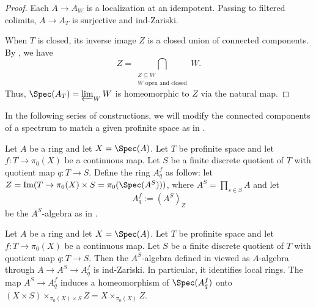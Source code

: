 \begin{proof}
  \leanok
  Each $A \to A_W$ is a localization at an idempotent. Passing to filtered colimits, $A \to A_T$ is surjective and ind-Zariski.

  When $T$ is closed, its inverse image $Z$ is a closed union of connected components. By , we have
  \[
    Z = \bigcap_{\substack{Z \subseteq W \\ W \text{ open and closed}}} W.
  \]
  Thus, $\Spec(A_T) = \varprojlim_W W$ is homeomorphic to $Z$ via the natural map.
\end{proof}

In the following series of constructions, we will modify the connected components of a spectrum to match a given profinite space as in {\cite[\href{https://stacks.math.columbia.edu/tag/097D}{Tag 097D}]{stacks-project}}.

\begin{definition}
  \label{def:modify-pi0-finite}
  \leanok
  Let $A$ be a ring and let $X = \Spec (A)$. Let $T$ be profinite space and let 
  $f : T \to \pi_0(X)$ be a continuous map. Let \(S\) be a finite discrete quotient of 
  \(T\) with quotient map \(q : T \to S\).  Define the ring $A^f_{q}$ as follow: 
  let $Z = \operatorname{Im} (T \to \pi_0(X) \times S = \pi_0(\Spec (A^{S})))$, 
  where \(A^{S} = \prod_{s \in S} A\) and let 
  \[A^f_{q} := (A^{S})_{Z}\] 
  be the $A^S$-algebra as in .
\end{definition}

\begin{lemma}
  \label{thm:modify-pi0-finite-properties}
  \leanok
  Let $A$ be a ring and let $X = \Spec (A)$. Let $T$ be profinite space and let $f : T \to \pi_0(X)$ be a continuous map. Let \(S\) be a finite discrete quotient of \(T\) with quotient map \(q : T \to S\). Then the $A^S$-algebra defined in  viewed as $A$-algebra through $A \to A^S \to A^f_{q}$ is ind-Zariski. In particular, it identifies local rings. The map $A^S \to A^f_{q}$ induces a homeomorphism of $\Spec (A^f_{q})$ onto \((X \times S) \times_{\pi_0(X) \times S} Z = X \times_{\pi_0(X)} Z\).
\end{lemma}

